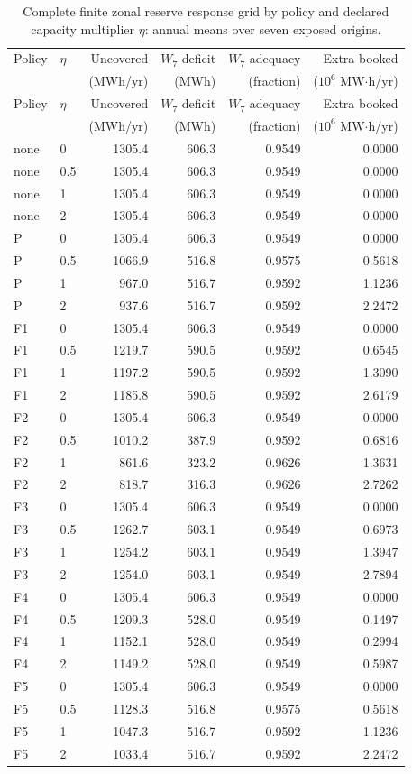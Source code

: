 {\scriptsize
\begin{longtable}{@{}llrrrr@{}}
\caption{Complete finite zonal reserve response grid by policy and declared capacity multiplier $\eta$: annual means over seven exposed origins.}\label{sup:r2-physical-grid}\\
\toprule
Policy & $\eta$ & Uncovered & $W_7$ deficit & $W_7$ adequacy & Extra booked \\
& & (MWh/yr) & (MWh) & (fraction) & ($10^6$ MW$\cdot$h/yr) \\
\midrule
\endfirsthead
\toprule
Policy & $\eta$ & Uncovered & $W_7$ deficit & $W_7$ adequacy & Extra booked \\
& & (MWh/yr) & (MWh) & (fraction) & ($10^6$ MW$\cdot$h/yr) \\
\midrule
\endhead
\bottomrule
\endlastfoot
none & 0 & 1305.4 & 606.3 & 0.9549 & 0.0000 \\
none & 0.5 & 1305.4 & 606.3 & 0.9549 & 0.0000 \\
none & 1 & 1305.4 & 606.3 & 0.9549 & 0.0000 \\
none & 2 & 1305.4 & 606.3 & 0.9549 & 0.0000 \\
P & 0 & 1305.4 & 606.3 & 0.9549 & 0.0000 \\
P & 0.5 & 1066.9 & 516.8 & 0.9575 & 0.5618 \\
P & 1 & 967.0 & 516.7 & 0.9592 & 1.1236 \\
P & 2 & 937.6 & 516.7 & 0.9592 & 2.2472 \\
F1 & 0 & 1305.4 & 606.3 & 0.9549 & 0.0000 \\
F1 & 0.5 & 1219.7 & 590.5 & 0.9592 & 0.6545 \\
F1 & 1 & 1197.2 & 590.5 & 0.9592 & 1.3090 \\
F1 & 2 & 1185.8 & 590.5 & 0.9592 & 2.6179 \\
F2 & 0 & 1305.4 & 606.3 & 0.9549 & 0.0000 \\
F2 & 0.5 & 1010.2 & 387.9 & 0.9592 & 0.6816 \\
F2 & 1 & 861.6 & 323.2 & 0.9626 & 1.3631 \\
F2 & 2 & 818.7 & 316.3 & 0.9626 & 2.7262 \\
F3 & 0 & 1305.4 & 606.3 & 0.9549 & 0.0000 \\
F3 & 0.5 & 1262.7 & 603.1 & 0.9549 & 0.6973 \\
F3 & 1 & 1254.2 & 603.1 & 0.9549 & 1.3947 \\
F3 & 2 & 1254.0 & 603.1 & 0.9549 & 2.7894 \\
F4 & 0 & 1305.4 & 606.3 & 0.9549 & 0.0000 \\
F4 & 0.5 & 1209.3 & 528.0 & 0.9549 & 0.1497 \\
F4 & 1 & 1152.1 & 528.0 & 0.9549 & 0.2994 \\
F4 & 2 & 1149.2 & 528.0 & 0.9549 & 0.5987 \\
F5 & 0 & 1305.4 & 606.3 & 0.9549 & 0.0000 \\
F5 & 0.5 & 1128.3 & 516.8 & 0.9575 & 0.5618 \\
F5 & 1 & 1047.3 & 516.7 & 0.9592 & 1.1236 \\
F5 & 2 & 1033.4 & 516.7 & 0.9592 & 2.2472 \\
\end{longtable}
}
